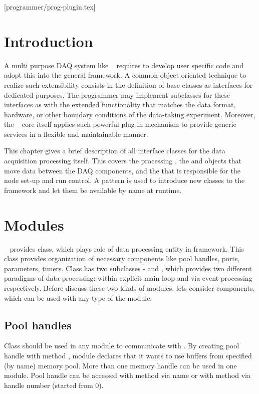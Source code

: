 [programmer/prog-plugin.tex]
\section{Introduction}
A multi purpose DAQ system like \dabc~ requires to develop user specific code and adopt
this into the general framework. A common object oriented technique to realize such
extensibility consists in the definition of base classes as interfaces for dedicated purposes.
The programmer may implement subclasses for these interfaces as 
with the extended functionality that matches the data format, hardware, or other boundary conditions of the
data-taking experiment. Moreover, the  \dabc~ core itself applies such powerful plug-in mechanism to provide 
generic services in a flexible and maintainable manner.   

This chapter gives a brief description of all interface classes for the data acquisition 
processing itself. This covers the processing , the  and 
 objects that move data between the DAQ components, 
and the  that is responsible for the node set-up and run control.
A  pattern is used to introduce new classes to the framework and let them
be available by name at runtime.

\section{Modules}

\dabc~ provides  class, which plays role of data processing entity in framework. 
This class provides organization of necessary components like pool handles, ports, parameters, timers.
Class  has two subclasses -  and ,
which provides two different paradigms of data processing: within explicit main loop and via event processing respectively.
Before discuss these two kinds of modules, lets consider components, which can be used with any type 
of the module.  


\subsection{Pool handles}

Class  should be used in any module to communicate with .
By creating pool handle with method , module declares that it 
wants to use buffers from specified (by name) memory pool. 
More than one memory handle can be used in one module. 
Pool handle can be accessed with method  via name or
 with method  via handle number (started from 0).     

